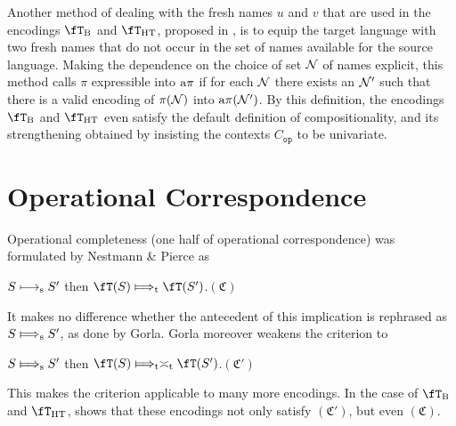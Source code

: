 \documentclass[runningheads]{llncs}
\newcommand{\N} {{\cal N}}               %
\newcommand{\trans}[1]{\fT(#1)}
\newcommand{\op}{\mathtt{op}}
\newcommand{\pims}{\pi}
\newcommand{\pima}{{\rm a\pi}}
\begin{document}
Another method of dealing with the fresh names $u$ and $v$ that are used in the encodings $\fT_{\rm B}$ and $\fT_{\rm HT}$,
proposed in \cite{vG12}, is to equip the target language with two fresh names that do not occur
in the set of names available for the source language. Making the dependence on the choice of set
$\N$ of names explicit, this method calls $\pims$ expressible into $\pima$ if for each $\N$ there
exists an $\N'$ such that there is a valid encoding of $\pi(\N)$ into $\pima(\N')$.
By this definition, the encodings $\fT_{\rm B}$ and $\fT_{\rm HT}$ even satisfy the default
definition of compositionality, and its strengthening obtained by insisting the contexts $C_\op$ to be univariate.

\section{Operational Correspondence}\label{sec:operational correspondence}

Operational completeness (one half of operational correspondence) was formulated by Nestmann \&
Pierce \cite{NestmannP00} as
\begin{center}
\mbox{}\hfill
$S \longmapsto_{\rm s} S'$ then $\trans{S}\Longmapsto_{\rm t} \trans{S'}$.\hfill$(\mathfrak{C})$
\end{center}
It makes no difference whether the antecedent of this implication is rephrased as $S \Longmapsto_{\rm s} S'$,
as done by Gorla. Gorla moreover weakens the criterion to
\begin{center}
\mbox{}\hfill
$S \Longmapsto_{\rm s} S'$ then $\trans{S}\Longmapsto_{\rm t}\asymp_{\rm t} \trans{S'}$.\hfill$(\mathfrak{C}')$
\end{center}
This makes the criterion applicable to many more encodings. In the case of $\fT_{\rm B}$ and $\fT_{\rm HT}$,
\cite{vG18a} shows that these encodings not only satisfy $(\mathfrak{C}')$, but even $(\mathfrak{C})$.
\end{document}
